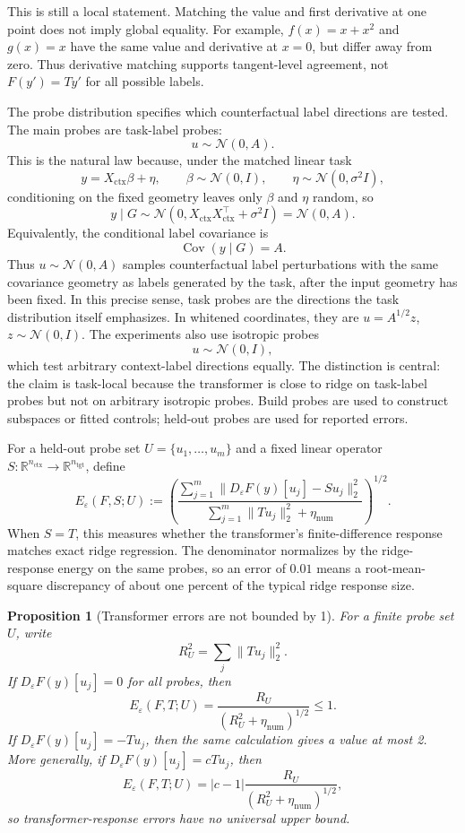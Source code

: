 \documentclass[11pt]{article}
\newtheorem{proposition}{Proposition}
\newcommand{\R}{\mathbb{R}}
\newcommand{\Cov}{\operatorname{Cov}}
\begin{document}
This is still a local statement. Matching the value and first derivative at one point does not imply
global equality. For example, \(f(x)=x+x^2\) and \(g(x)=x\) have the same value and derivative at
\(x=0\), but differ away from zero. Thus derivative matching supports tangent-level agreement,
not \(F(y')=Ty'\) for all possible labels.

The probe distribution specifies which counterfactual label directions are tested. The main probes
are task-label probes:
\[
u\sim\mathcal{N}(0,A).
\]
This is the natural law because, under the matched linear task
\[
y=X_{\mathrm{ctx}}\beta+\eta,\qquad
\beta\sim\mathcal{N}(0,I),\qquad
\eta\sim\mathcal{N}(0,\sigma^2I),
\]
conditioning on the fixed geometry leaves only \(\beta\) and \(\eta\) random, so
\[
y\mid G\sim\mathcal{N}(0,X_{\mathrm{ctx}}X_{\mathrm{ctx}}^\top+\sigma^2I)
=\mathcal{N}(0,A).
\]
Equivalently, the conditional label covariance is
\[
\Cov(y\mid G)=A.
\]
Thus \(u\sim\mathcal{N}(0,A)\) samples counterfactual label perturbations with the same covariance
geometry as labels generated by the task, after the input geometry has been fixed. In this precise
sense, task probes are the directions the task distribution itself emphasizes. In whitened coordinates,
they are \(u=A^{1/2}z\), \(z\sim\mathcal{N}(0,I)\). The experiments also use isotropic probes
\[
u\sim\mathcal{N}(0,I),
\]
which test arbitrary context-label directions equally. The distinction is central: the claim is
task-local because the transformer is close to ridge on task-label probes but not on arbitrary
isotropic probes. Build probes are used to construct subspaces or fitted controls; held-out probes
are used for reported errors.

For a held-out probe set \(U=\{u_1,\ldots,u_m\}\) and a fixed linear operator
\(S:\R^{n_{\mathrm{ctx}}}\to\R^{n_{\mathrm{tgt}}}\), define
\[
E_\varepsilon(F,S;U)
:=
\left(
\frac{
\sum_{j=1}^m\|D_\varepsilon F(y)[u_j]-Su_j\|_2^2
}{
\sum_{j=1}^m\|Tu_j\|_2^2+\eta_{\mathrm{num}}
}
\right)^{1/2}.
\]
When \(S=T\), this measures whether the transformer's finite-difference response matches exact
ridge regression. The denominator normalizes by the ridge-response energy on the same probes, so
an error of \(0.01\) means a root-mean-square discrepancy of about one percent of the typical ridge
response size.

\begin{proposition}[Transformer errors are not bounded by 1]
For a finite probe set \(U\), write
\[
R_U^2=\sum_j\|Tu_j\|_2^2.
\]
If \(D_\varepsilon F(y)[u_j]=0\) for all probes, then
\[
E_\varepsilon(F,T;U)=\frac{R_U}{(R_U^2+\eta_{\mathrm{num}})^{1/2}}\le 1.
\]
If \(D_\varepsilon F(y)[u_j]=-Tu_j\), then the same calculation gives a value at most 2. More
generally, if \(D_\varepsilon F(y)[u_j]=cTu_j\), then
\[
E_\varepsilon(F,T;U)
=
|c-1|\frac{R_U}{(R_U^2+\eta_{\mathrm{num}})^{1/2}},
\]
so transformer-response errors have no universal upper bound.
\end{proposition}
\end{document}
